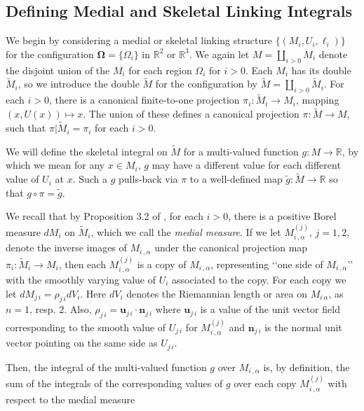 \documentclass[10pt]{amsart}
\theoremstyle{definition}
\theoremstyle{definition}
\numberwithin{equation}{section}
\newcommand{\R}{{\mathbb R}}
\def \bn {\mathbf {n}}
\def \bu {\mathbf {u}}
\def \bgW {\boldsymbol \Omega}
\def \ga {\alpha}
\def \gW {\Omega}
\begin{document}
\subsection*{Defining Medial and  Skeletal Linking Integrals}
\par
We begin by considering a medial or skeletal linking structure $\{(M_i, 
U_i, \ell_i)\}$ for the configuration $\bgW = \{ \gW_i\}$ in 
$\R^2$ or $\R^3$.  We again let $M = \coprod_{i > 0} M_i$ denote the 
disjoint 
union of the $M_i$ for each region $\gW_i$ for $i > 0$.   
Each $M_i$ has its double $\tilde M_i$, so we introduce the double $\tilde 
M$ for the configuration by $\tilde M = \coprod_{i > 0} \tilde M_i$.  For 
each $i > 0$, there is a canonical finite-to-one projection $\pi_i : \tilde 
M_i \to M_i$, mapping $(x, U(x)) \mapsto x$.  The union of these defines a 
canonical projection $\pi : \tilde M \to M$, such that $\pi | \tilde M_i = 
\pi_i$ for each $i > 0$.  \par
We will define the skeletal integral on $\tilde M$ for a multi-valued 
function $g : M \to \R$, by which we mean for any $x \in M_i$, $g$ may 
have a different value for each different value of $U_i$ at $x$.  Such a $g$ 
pulls-back via $\pi$ to a well-defined map $\tilde g : \tilde M \to \R$ so 
that $g \circ \pi = \tilde g$.  \par
We recall that by Proposition 3.2 of \cite{D4}, for each $i > 0$, there is a 
positive Borel measure $dM_i$ on $\tilde M_i$, which we call the {\it 
medial measure}. If we let $M_{i\, ,\ga}^{(j)}$, $j = 1, 2$, denote the 
inverse images of $M_{i\, ,\ga}$ under the canonical projection map $\pi_i 
: \tilde M_i \to M_i$, then each $M_{i\, ,\ga}^{(j)}$ is a copy of $M_{i\, 
,\ga}$, representing \lq\lq one side of $M_{i\, ,\ga}$\rq\rq\, with the 
smoothly varying value of $U_{i}$ associated to the copy.  For each copy 
we let $dM_{j\, i} = \rho_{j\, i} dV_i$.  Here $dV_i$ denotes the 
Riemannian length or area on $M_{i\, \ga}$, as $n = 1$, resp. $2$.  Also, 
$\rho_{j\, i} = \bu_{j\, i}\cdot \bn_{j\,i}$ where $\bu_{j\, i}$ is a value 
of the unit vector field corresponding to the smooth value of 
$U_{j\, i}$ for $M_{i\, ,\ga}^{(j)}$ and $\bn_{j\, i}$ is the normal unit 
vector pointing on the same side as $U_{j\, i}$.  \par
Then, the integral of the multi-valued function $g$ over $M_{i\, ,\ga}$ is, 
by definition, the sum of the integrals of the corresponding values of $g$ 
over each copy $M_{i\, ,\ga}^{(j)}$ with respect to the medial measure 
\end{document}

